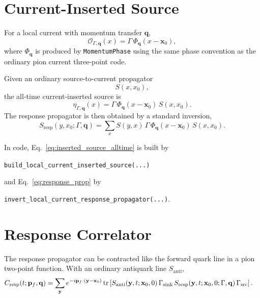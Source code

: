 \documentclass[11pt,a4paper]{article}
\newcommand{\Sresp}{S_{\mathrm{resp}}}
\newcommand{\Ocur}{\mathcal{O}}
\newcommand{\gsrc}{\Gamma_{\mathrm{src}}}
\newcommand{\gsink}{\Gamma_{\mathrm{sink}}}
\newcommand{\Cresp}{C_{\mathrm{resp}}}
\begin{document}
\section{Current-Inserted Source}

For a local current with momentum transfer \(\mathbf q\),
\begin{equation}
  \Ocur_{\Gamma,\mathbf q}(x)
  =
  \Gamma\,\Phi_{\mathbf q}(x-\mathbf x_0),
\end{equation}
where \(\Phi_{\mathbf q}\) is produced by \texttt{MomentumPhase} using the same
phase convention as the ordinary pion current three-point code.

Given an ordinary source-to-current propagator
\begin{equation}
  S(x,x_0),
\end{equation}
the all-time current-inserted source is
\begin{equation}
  \eta_{\Gamma,\mathbf q}(x)
  =
  \Gamma\,\Phi_{\mathbf q}(x-\mathbf x_0)\,S(x,x_0).
\label{eq:inserted_source_alltime}
\end{equation}
The response propagator is then obtained by a standard inversion,
\begin{equation}
  \Sresp(y,x_0;\Gamma,\mathbf q)
  =
  \sum_x S(y,x)\,
  \Gamma\,\Phi_{\mathbf q}(x-\mathbf x_0)\,
  S(x,x_0).
\label{eq:response_prop}
\end{equation}

In code, Eq.~\eqref{eq:inserted_source_alltime} is built by
\begin{center}
\texttt{build\_local\_current\_inserted\_source(...)}
\end{center}
and Eq.~\eqref{eq:response_prop} by
\begin{center}
\texttt{invert\_local\_current\_response\_propagator(...)}.
\end{center}

\section{Response Correlator}

The response propagator can be contracted like the forward quark line in a pion
two-point function.  With an ordinary antiquark line \(S_{\mathrm{anti}}\),
\begin{align}
  \Cresp(t;\mathbf p_f,\mathbf q)
  &=
  \sum_{\mathbf y}
  e^{-i\mathbf p_f\cdot(\mathbf y-\mathbf x_0)}
  \tr\left[
    S_{\mathrm{anti}}(\mathbf y,t;\mathbf x_0,0)\,
    \gsink\,
    \Sresp(\mathbf y,t;\mathbf x_0,0;\Gamma,\mathbf q)\,
    \gsrc
  \right].
\label{eq:Cresponse}
\end{align}
\end{document}

